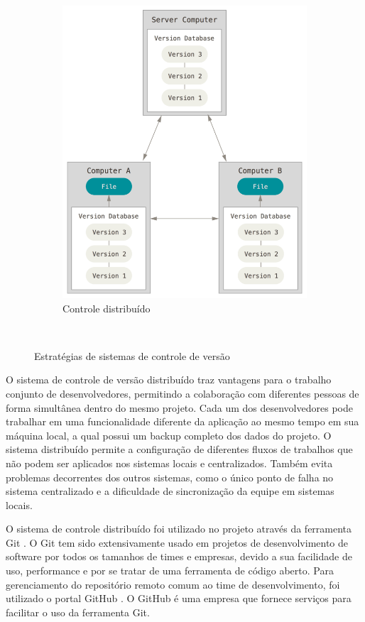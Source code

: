 \begin{figure}[h]
\begin{subfigure}[b]{0.3\textwidth}
       \includegraphics[width=\textwidth]{pfc/figuras/control-version-distributed.png}
       \caption{Controle distribuído}
       \label{fig:version-control-distributed}
    \end{subfigure}
    ~
    \caption{Estratégias de sistemas de controle de versão}
    \label{fig:version-control}
\end{figure}

O sistema de controle de versão distribuído traz vantagens para o trabalho conjunto de desenvolvedores, permitindo a colaboração com diferentes pessoas de forma simultânea dentro do mesmo projeto. Cada um dos desenvolvedores pode trabalhar em uma funcionalidade diferente da aplicação ao mesmo tempo em sua máquina local, a qual possui um backup completo dos dados do projeto. O sistema distribuído permite a configuração de diferentes fluxos de trabalhos que não podem ser aplicados nos sistemas locais e centralizados. Também evita problemas decorrentes dos outros sistemas, como o único ponto de falha no sistema centralizado e a dificuldade de sincronização da equipe em sistemas locais.

O sistema de controle distribuído foi utilizado no projeto através da ferramenta Git . O Git tem sido extensivamente usado em projetos de desenvolvimento de software por todos os tamanhos de times e empresas, devido a sua facilidade de uso, performance e por se tratar de uma ferramenta de código aberto. Para gerenciamento do repositório remoto comum ao time de desenvolvimento, foi utilizado o portal GitHub . O GitHub é uma empresa que fornece serviços para facilitar o uso da ferramenta Git.

